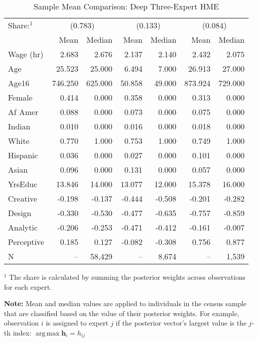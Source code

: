 \documentclass[12pt]{article}
\DeclareMathOperator*{\argmax}{arg\,max}
\begin{document}
  \begin{table} \centering
    \caption{Sample Mean Comparison: Deep Three-Expert HME}
    \begin{threeparttable}
      \begin{tabular}[l]{l r r r r r r}
    \cmidrule{1-7}
    Share:$^{1}$& \multicolumn{2}{c}{(0.783)} & \multicolumn{2}{c}{(0.133)} & \multicolumn{2}{c}{(0.084)} \\
                & Mean & Median & Mean & Median & Mean & Median \\
    \cmidrule{1-7}
    Wage (hr)   &   2.683 &   2.676 &  2.137 &  2.140 &   2.432 &   2.075 \\
    Age         &  25.523 &  25.000 &  6.494 &  7.000 &  26.913 &  27.000 \\
    Age16       & 746.250 & 625.000 & 50.858 & 49.000 & 873.924 & 729.000 \\
    Female      &   0.414 &   0.000 &  0.358 &  0.000 &   0.313 &   0.000 \\
    Af Amer     &   0.088 &   0.000 &  0.073 &  0.000 &   0.075 &   0.000 \\
    Indian      &   0.010 &   0.000 &  0.016 &  0.000 &   0.018 &   0.000 \\
    White       &   0.770 &   1.000 &  0.753 &  1.000 &   0.749 &   1.000 \\
    Hispanic    &   0.036 &   0.000 &  0.027 &  0.000 &   0.101 &   0.000 \\
    Asian       &   0.096 &   0.000 &  0.131 &  0.000 &   0.057 &   0.000 \\
    YrsEduc     &  13.846 &  14.000 & 13.077 & 12.000 &  15.378 &  16.000 \\
    Creative    &  -0.198 &  -0.137 & -0.444 & -0.508 &  -0.201 &  -0.282 \\
    Design      &  -0.330 &  -0.530 & -0.477 & -0.635 &  -0.757 &  -0.859 \\
    Analytic    &  -0.206 &  -0.253 & -0.471 & -0.412 &  -0.161 &  -0.007 \\
    Perceptive  &   0.185 &   0.127 & -0.082 & -0.308 &   0.756 &   0.877 \\
    \cmidrule{1-7}
    N           &      -- &  58,429 &     -- &  8,674 &      -- &   1,539 \\
    \hline
      \end{tabular}
      \begin{tablenotes}
        \item{\footnotesize $^{1}$ The share is calculated by summing the 
        posterior weights across observations for each expert.}
        \item{\footnotesize \textbf{Note:} Mean and median values are applied to individuals
        in the census sample that are classified based on the value of their posterior weights.
        For example, observation $i$ is assigned to expert $j$ if the posterior vector's
        largest value is the $j$-th index: $\argmax \boldsymbol{h}_{i} = h_{ij}$}
      \end{tablenotes} \label{tbl:HME3_sample_comparison}
    \end{threeparttable}
  \end{table}
\end{document}
